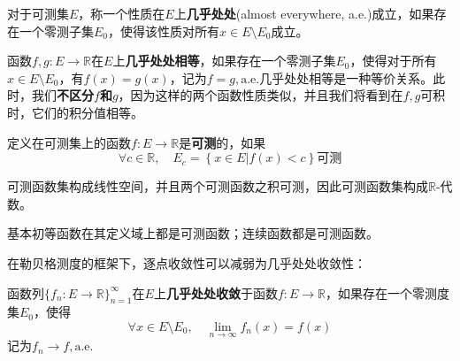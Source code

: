\begin{definition}[几乎处处]
    对于可测集$E$，称一个性质在$E$上\textbf{几乎处处}(almost everywhere, a.e.)成立，如果存在一个零测子集$E_0$，使得该性质对所有$x\in E\setminus E_0$成立。
\end{definition}

\begin{example}[几乎处处相等]
    函数$f,g:E\to\mathbb{R}$在$E$上\textbf{几乎处处相等}，如果存在一个零测子集$E_0$，使得对于所有$x\in E\setminus E_0$，有$f(x)=g(x)$，记为$f=g,\mathrm{a.e.}$几乎处处相等是一种等价关系。此时，我们\textbf{不区分$f$和$g$}，因为这样的两个函数性质类似，并且我们将看到在$f,g$可积时，它们的积分值相等。
\end{example}

\begin{definition}[可测函数]
    定义在可测集上的函数$f:E\to\mathbb{R}$是\textbf{可测}的，如果
    $$\forall c\in\mathbb{R},\quad E_c=\left\{x\in E\left| f(x)<c\right.\right\}\text{可测}$$
\end{definition}

可测函数集构成线性空间，并且两个可测函数之积可测，因此可测函数集构成$\mathbb{R}$-代数。

\begin{example}
    基本初等函数在其定义域上都是可测函数；连续函数都是可测函数。
\end{example}

%
%
%
%
%
在勒贝格测度的框架下，逐点收敛性可以减弱为几乎处处收敛性：

\begin{definition}[几乎处处收敛]
    函数列$\{f_n:E\to\mathbb{R}\}_{n=1}^{\infty}$在$E$上\textbf{几乎处处收敛}于函数$f:E\to\mathbb{R}$，如果存在一个零测度集$E_0$，使得
    $$\forall x\in E\setminus E_0,\quad\lim_{n\to\infty}f_n(x)=f(x)$$
    记为$f_n\to f,\mathrm{a.e.}$
\end{definition}

